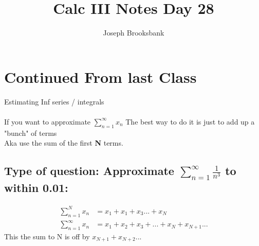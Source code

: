 \documentclass[12pt]{article}
\title{Calc III Notes Day 28}
\author{Joseph Brooksbank}
\begin{document}
\maketitle

\section*{Continued From last Class}
Estimating Inf series / integrals
\\
\\
If you want to approximate $\sum_{n=1}^{\infty} x_n $ The best way to do it is just to add up a "bunch" of terms 
\\
Aka use the sum of the first \textbf{N} terms.
\\
\subsection*{Type of question: Approximate $\sum_{n=1}^{\infty}\frac{1}{n^{3}}$ to within 0.01:}

\begin{align*}
        \sum_{n=1}^{N}x_n &= x_1 + x_1 +x_3...+x_N \\
        \sum_{n=1}^{\infty}x_n &= x_1 + x_2 + x_3 +... + x_N + x_{N+1}...
\end{align*}
This the sum to N is off by $x_{N+1} + x_{N+2}...$ 
\end{document}

